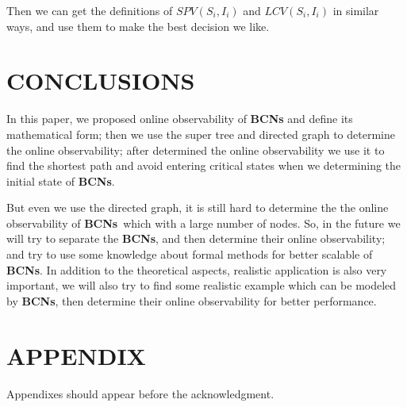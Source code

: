 \documentclass[letterpaper, 10 pt, conference]{ieeeconf}  %
\def \BCNs {{\bf BCNs}}
\begin{document}
Then we can get the definitions of $SPV(S_i, I_i)$ and $LCV(S_i, I_i)$ in similar ways, and use them to make the best decision we like.
\section{CONCLUSIONS}

In this paper, we proposed online observability of {\bf BCNs} and define its mathematical form;  then we use the super tree and directed graph to determine the online observability; after determined the online observability we use it to find the shortest path and avoid entering critical states when we determining the initial state of {\bf BCNs}. 

But even we use the directed graph, it is still hard to determine the  the online observability of \BCNs\ which with a large number of nodes. So, in the future we will try to separate the {\bf BCNs}, and then determine their online observability; and try to use some knowledge about formal methods for better scalable of {\bf BCNs}. In addition to the theoretical aspects, realistic application is also very important, we will also try to find some realistic example which can be modeled by {\bf BCNs}, then determine their online observability for better performance.
\addtolength{\textheight}{-12cm}   %







\section*{APPENDIX}

Appendixes should appear before the acknowledgment.
\end{document}
